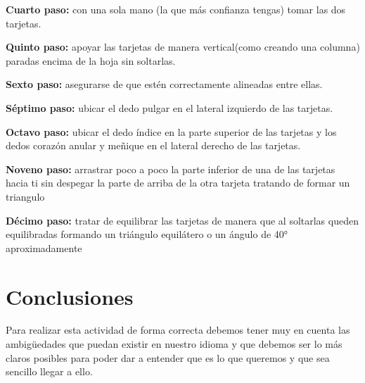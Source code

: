 \documentclass{article}
\begin{document}
\textbf{Cuarto paso: }
con una sola mano (la que más confianza tengas) tomar las dos tarjetas.
\vspace{0.3cm}

\textbf{Quinto paso: }
apoyar las tarjetas de manera vertical(como creando una columna) paradas encima de la hoja sin soltarlas.
\vspace{0.3cm}

\textbf{Sexto paso: } 
asegurarse de que estén correctamente alineadas entre ellas.
\vspace{0.3cm}

\textbf{Séptimo paso: }
ubicar el dedo pulgar en el lateral izquierdo de las tarjetas.
\vspace{0.3cm}

\textbf{Octavo paso: }
ubicar el dedo índice en la parte superior de las tarjetas y los dedos corazón anular y meñique en el lateral derecho de las tarjetas.
\vspace{0.3cm}

\textbf{Noveno paso: }
arrastrar poco a poco la parte inferior de una de las tarjetas hacia ti sin despegar la parte de arriba de la otra tarjeta tratando de formar un triangulo
\vspace{0.3cm}

\textbf{Décimo paso: }
tratar de equilibrar las tarjetas de manera que al soltarlas queden equilibradas formando un triángulo equilátero o un ángulo de 40° aproximadamente 
\vspace{0.3cm}

\newpage
\section{Conclusiones}\label{Conclusiones}
Para realizar esta actividad de forma correcta debemos tener muy en cuenta las ambigüedades que puedan existir en nuestro idioma y que debemos ser lo más claros posibles para poder dar a entender que es lo que queremos y que sea sencillo llegar a ello.
\end{document}
